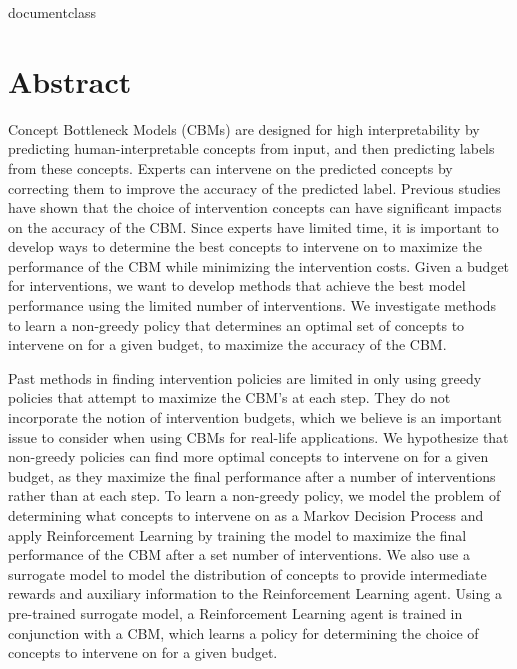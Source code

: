 \csname documentclass

\chapter*{Abstract}




Concept Bottleneck Models (CBMs) are designed for high interpretability by predicting 
human-interpretable concepts from input, 
and then predicting labels from these concepts. Experts can intervene on the 
predicted concepts
by correcting them to improve the accuracy of the predicted label. Previous 
studies have shown that the choice of intervention concepts 
can have significant impacts on the accuracy of the CBM.
Since experts have limited time, it is important to develop ways to
determine the best concepts to intervene on to maximize the performance 
of the CBM
while minimizing the intervention costs. Given a budget
for interventions, we want to develop methods that achieve the best model performance
using the limited number of interventions.
We investigate methods to learn a non-greedy policy that determines an optimal set of 
concepts to intervene on
for a given budget, to maximize the accuracy of the CBM.

Past methods in finding intervention policies are limited in
only using greedy policies 
that attempt to maximize the CBM's at each step.
They do not incorporate the notion of intervention budgets,
which we believe is an important issue to consider when using CBMs for real-life applications.
We hypothesize that non-greedy policies can find more optimal concepts to intervene on for a 
given budget,
as they maximize the final performance after a number of interventions rather than at each step.
To learn a non-greedy policy, we model the problem of determining what concepts to intervene on
as a Markov Decision Process
and apply Reinforcement Learning by training the model to maximize the final performance of the CBM
after a set number of interventions.
We also use a surrogate model to model the distribution of concepts to provide intermediate rewards and auxiliary information to the
Reinforcement Learning agent.
Using a pre-trained surrogate model, a Reinforcement Learning agent 
is trained in conjunction with a CBM, 
which learns a policy for determining the choice of concepts
to intervene on for a given budget.

